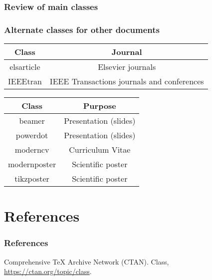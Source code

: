 \documentclass[11pt]{beamer}
\begin{document}
\begin{frame}
	\frametitle{Review of main classes}
	\frametitle{Alternate classes for other documents}
	
	\begin{table}[h]
		\begin{tabular}{*{2}{c}}
			\toprule
			  Class    &                  Journal                   \\ \midrule
			elsarticle &             Elsevier journals              \\
			 IEEEtran  & IEEE Transactions journals and conferences \\ \bottomrule
		\end{tabular}
	\end{table}

	\begin{table}[h]
		\begin{tabular}{*{2}{c}}
			\toprule
			   Class     &        Purpose        \\ \midrule
			   beamer    & Presentation (slides) \\
			  powerdot   & Presentation (slides) \\
			  moderncv   &   Curriculum Vitae    \\
			modernposter &   Scientific poster   \\
			 tikzposter  &   Scientific poster   \\ \bottomrule
		\end{tabular}
	\end{table}
\end{frame}


\section{References}

\begin{frame}
	\frametitle{References}
	
	\begin{thebibliography}{Biblio}
		Comprehensive \TeX{} Archive Network (CTAN).
		\newblock Class, \url{https://ctan.org/topic/class}.
	\end{thebibliography}
\end{frame}

\end{document}
